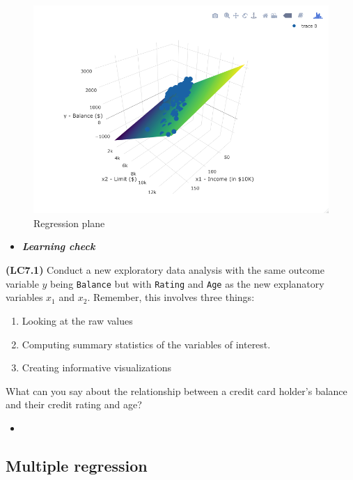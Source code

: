 \documentclass[12pt,]{krantz}
\providecommand{\tightlist}{%
  \setlength{\itemsep}{0pt}\setlength{\parskip}{0pt}}
\newenvironment{rmdblock}[1]
  {\begin{shaded*}
  \begin{itemize}
  \renewcommand{\labelitemi}{
    \raisebox{-.7\height}[0pt][0pt]{
    }
  }
  \item
  }
  {
  \end{itemize}
  \end{shaded*}
  }
\newenvironment{learncheck}
  {\begin{rmdblock}{warning}}
  {\end{rmdblock}}
\begin{document}
\begin{figure}

{\centering \includegraphics[width=\textwidth]{images/credit_card_balance_regression_plane} 

}

\caption{Regression plane}\label{fig:unnamed-chunk-232}
\end{figure}

\begin{learncheck}
\textbf{\emph{Learning check}}
\end{learncheck}

\textbf{(LC7.1)} Conduct a new exploratory data analysis with the same
outcome variable \(y\) being \texttt{Balance} but with \texttt{Rating}
and \texttt{Age} as the new explanatory variables \(x_1\) and \(x_2\).
Remember, this involves three things:

\begin{enumerate}
\def\labelenumi{\alph{enumi})}
\tightlist
\item
  Looking at the raw values
\item
  Computing summary statistics of the variables of interest.
\item
  Creating informative visualizations
\end{enumerate}

What can you say about the relationship between a credit card holder's
balance and their credit rating and age?

\begin{learncheck}

\end{learncheck}

\subsection{Multiple regression}\label{model3table}
\end{document}
